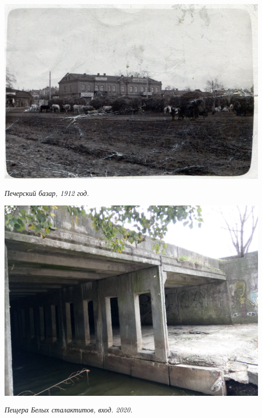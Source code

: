 \begin{center}
\includegraphics[width=\linewidth]{rpix/pechbaz.jpg}

\textit{Печерский базар, 1912 год.}
\end{center}


\begin{center}
\includegraphics[width=\linewidth]{rpix/IMG_20201109_125816.jpg}

\textit{Пещера Белых сталактитов, вход. 2020.}
\end{center}





